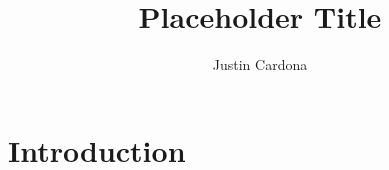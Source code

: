 \documentclass[reprint]{revtex4-2}
\begin{document}
\title{Placeholder Title}
\author{Justin Cardona}
\begin{abstract}
\end{abstract}
\maketitle


\section{Introduction}

\end{document}

